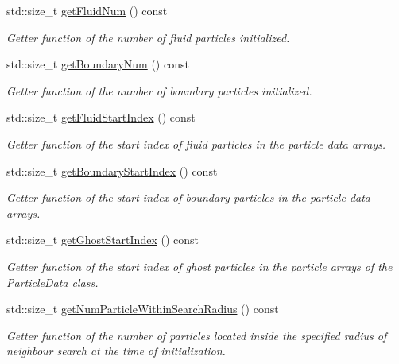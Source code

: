 \begin{DoxyCompactItemize}
std\-::size\-\_\-t \hyperlink{classInitializer_a5b13b014185a5a2b7cf8c0f8b23e07c0}{get\-Fluid\-Num} () const 
\begin{DoxyCompactList}\small\item\em Getter function of the number of {\itshape fluid} particles initialized. \end{DoxyCompactList}\item 
std\-::size\-\_\-t \hyperlink{classInitializer_a68bbcc759e78e4774d32b1cd3a71ef82}{get\-Boundary\-Num} () const 
\begin{DoxyCompactList}\small\item\em Getter function of the number of {\itshape boundary} particles initialized. \end{DoxyCompactList}\item 
std\-::size\-\_\-t \hyperlink{classInitializer_a96076c67424121f0b546571faa2bcba6}{get\-Fluid\-Start\-Index} () const 
\begin{DoxyCompactList}\small\item\em Getter function of the start index of fluid particles in the particle data arrays. \end{DoxyCompactList}\item 
std\-::size\-\_\-t \hyperlink{classInitializer_ae9ff8c4f144f3dee1b14ec72e7c59157}{get\-Boundary\-Start\-Index} () const 
\begin{DoxyCompactList}\small\item\em Getter function of the start index of boundary particles in the particle data arrays. \end{DoxyCompactList}\item 
std\-::size\-\_\-t \hyperlink{classInitializer_a9458ff0d23312baa3f13f0ad8c96aaba}{get\-Ghost\-Start\-Index} () const 
\begin{DoxyCompactList}\small\item\em Getter function of the start index of ghost particles in the particle arrays of the \hyperlink{classParticleData}{Particle\-Data} class. \end{DoxyCompactList}\item 
std\-::size\-\_\-t \hyperlink{classInitializer_a85aa458bf8657237aa018fc0d01ecac9}{get\-Num\-Particle\-Within\-Search\-Radius} () const 
\begin{DoxyCompactList}\small\item\em Getter function of the number of particles located inside the specified radius of neighbour search at the time of initialization. \end{DoxyCompactList}\item 

\end{DoxyCompactItemize}

